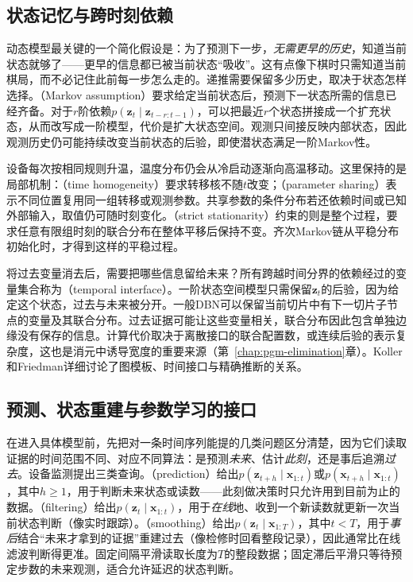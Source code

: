 \subsection{状态记忆与跨时刻依赖}
\label{sec:pgm-dynamic-memory}

动态模型最关键的一个简化假设是：为了预测下一步，\emph{无需更早的历史}，知道当前状态就够了——更早的信息都已被当前状态“吸收”。这有点像下棋时只需知道当前棋局，而不必记住此前每一步怎么走的。递推需要保留多少历史，取决于状态怎样选择。（Markov assumption）要求给定当前状态后，预测下一状态所需的信息已经齐备。对于$r$阶依赖$p(\bm{z}_t\mid\bm{z}_{t-r:t-1})$，可以把最近$r$个状态拼接成一个扩充状态，从而改写成一阶模型，代价是扩大状态空间。观测只间接反映内部状态，因此观测历史仍可能持续改变当前状态的后验，即使潜状态满足一阶Markov性。

设备每次按相同规则升温，温度分布仍会从冷启动逐渐向高温移动。这里保持的是局部机制：（time homogeneity）要求转移核不随$t$改变；（parameter sharing）表示不同位置复用同一组转移或观测参数。共享参数的条件分布若还依赖时间或已知外部输入，取值仍可随时刻变化。（strict stationarity）约束的则是整个过程，要求任意有限组时刻的联合分布在整体平移后保持不变。齐次Markov链从平稳分布初始化时，才得到这样的平稳过程。

将过去变量消去后，需要把哪些信息留给未来？所有跨越时间分界的依赖经过的变量集合称为（temporal interface）。一阶状态空间模型只需保留$\bm{z}_t$的后验，因为给定这个状态，过去与未来被分开。一般DBN可以保留当前切片中有下一切片子节点的变量及其联合分布。过去证据可能让这些变量相关，联合分布因此包含单独边缘没有保存的信息。计算代价取决于离散接口的联合配置数，或连续后验的表示复杂度，这也是消元中诱导宽度的重要来源（第~\ref{chap:pgm-elimination}章）。Koller和Friedman详细讨论了图模板、时间接口与精确推断的关系。

\subsection{预测、状态重建与参数学习的接口}
\label{sec:pgm-dynamic-queries}

在进入具体模型前，先把对一条时间序列能提的几类问题区分清楚，因为它们读取证据的时间范围不同、对应不同算法：是预测\emph{未来}、估计\emph{此刻}，还是事后追溯\emph{过去}。设备监测提出三类查询。（prediction）给出$p(\bm{z}_{t+h}\mid\bm{x}_{1:t})$或$p(\bm{x}_{t+h}\mid\bm{x}_{1:t})$，其中$h\geq1$，用于判断未来状态或读数——此刻做决策时只允许用到目前为止的数据。（filtering）给出$p(\bm{z}_t\mid\bm{x}_{1:t})$，用于\emph{在线}地、收到一个新读数就更新一次当前状态判断（像实时跟踪）。（smoothing）给出$p(\bm{z}_t\mid\bm{x}_{1:T})$，其中$t<T$，用于\emph{事后}结合“未来才拿到的证据”重建过去（像检修时回看整段记录），因此通常比在线滤波判断得更准。固定间隔平滑读取长度为$T$的整段数据；固定滞后平滑只等待预定步数的未来观测，适合允许延迟的状态判断。

